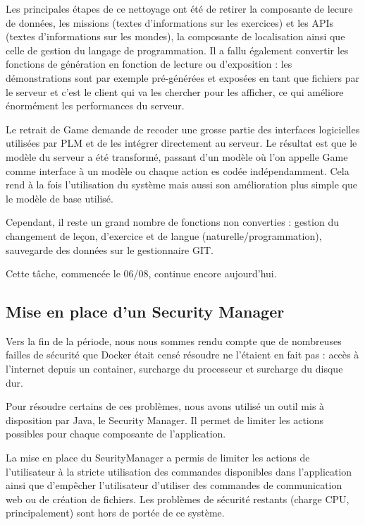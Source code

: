 \documentclass[stage]{tnreport}
\begin{document}
Les principales étapes de ce nettoyage ont été de retirer la composante de lecure de données, les missions (textes d'informations sur les exercices) et les APIs (textes d'informations sur les mondes), la composante de localisation ainsi que celle de gestion du langage de programmation. Il a fallu également convertir les fonctions de génération en fonction de lecture ou d'exposition : les démonstrations sont par exemple pré-générées et exposées en tant que fichiers par le serveur et c'est le client qui va les chercher pour les afficher, ce qui améliore énormément les performances du serveur.

Le retrait de Game demande de recoder une grosse partie des interfaces logicielles utilisées par PLM et de les intégrer directement au serveur. Le résultat est que le modèle du serveur a été transformé, passant d'un modèle où l'on appelle Game comme interface à un modèle ou chaque action es codée indépendamment. Cela rend à la fois l'utilisation du système mais aussi son amélioration plus simple que le modèle de base utilisé.

Cependant, il reste un grand nombre de fonctions non converties : gestion du changement de leçon, d'exercice et de langue (naturelle/programmation), sauvegarde des données sur le gestionnaire GIT.

Cette tâche, commencée le 06/08, continue encore aujourd'hui.

\subsection{Mise en place d'un Security Manager}

Vers la fin de la période, nous nous sommes rendu compte que de nombreuses failles de sécurité que Docker était censé résoudre ne l'étaient en fait pas : accès à l'internet depuis un container, surcharge du processeur et surcharge du disque dur.

Pour résoudre certains de ces problèmes, nous avons utilisé un outil mis à disposition par Java, le Security Manager. Il permet de limiter les actions possibles pour chaque composante de l'application.

La mise en place du SeurityManager a permis de limiter les actions de l'utilisateur à la stricte utilisation des commandes disponibles dans l'application ainsi que d'empêcher l'utilisateur d'utiliser des commandes de communication web ou de création de fichiers. Les problèmes de sécurité restants (charge CPU, principalement) sont hors de portée de ce système.
\end{document}
